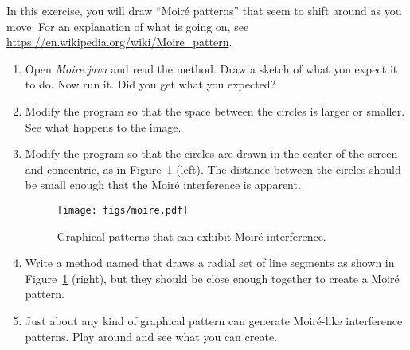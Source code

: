\begin{exercise}

In this exercise, you will draw ``Moir\'{e} patterns'' that seem to shift around as you move.
For an explanation of what is going on, see \url{https://en.wikipedia.org/wiki/Moire_pattern}.

\begin{enumerate}

\item Open {\it Moire.java} and read the  method.
Draw a sketch of what you expect it to do.
Now run it.
Did you get what you expected?

\item Modify the program so that the space between the circles is larger or smaller.
See what happens to the image.

\item Modify the program so that the circles are drawn in the center of the screen and concentric, as in Figure~\ref{fig.moire} (left).
The distance between the circles should be small enough that the Moir\'{e} interference is apparent.

\begin{figure}[!ht]
\begin{center}
\texttt{[image: figs/moire.pdf]}
\caption{Graphical patterns that can exhibit Moir\'{e} interference.}
\label{fig.moire}
\end{center}
\end{figure}

\item Write a method named  that draws a radial set of line segments as shown in Figure~\ref{fig.moire} (right), but they should be close enough together to create a Moir\'{e} pattern.

\item Just about any kind of graphical pattern can generate Moir\'{e}-like interference patterns.
Play around and see what you can create.

\end{enumerate}

\end{exercise}
